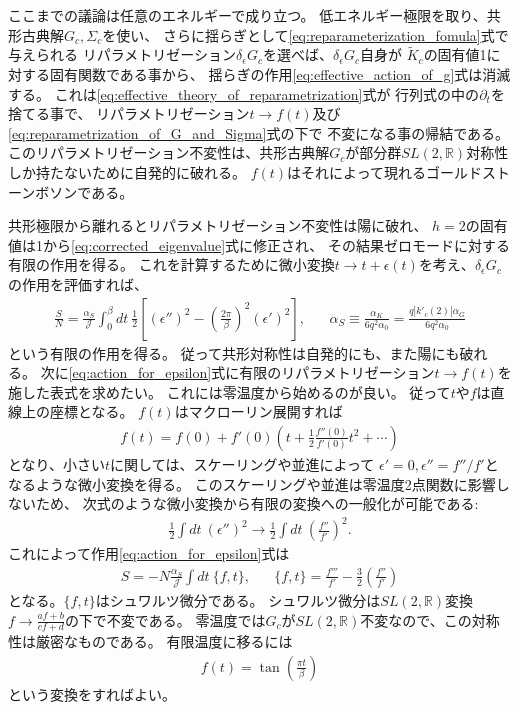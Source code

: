 ここまでの議論は任意のエネルギーで成り立つ。
低エネルギー極限を取り、共形古典解$G_c,\Sigma_c$を使い、
さらに揺らぎとして\eqref{eq:reparameterization_fomula}式で与えられる
リパラメトリゼーション$\delta_{\epsilon}G_c$を選べば、$\delta_{\epsilon}G_c$自身が
$\tilde{K}_c$の固有値1に対する固有関数である事から、
揺らぎの作用\eqref{eq:effective_action_of_g}式は消滅する。
これは\eqref{eq:effective_theory_of_reparametrization}式が
行列式の中の$\partial_t$を捨てる事で、
リパラメトリゼーション$t\to f(t)$及び\eqref{eq:reparametrization_of_G_and_Sigma}式の下で
不変になる事の帰結である。
このリパラメトリゼーション不変性は、共形古典解$G_c$が部分群$SL(2,\mathbb{R})$対称性
しか持たないために自発的に破れる。
$f(t)$はそれによって現れるゴールドストーンボソンである。

共形極限から離れるとリパラメトリゼーション不変性は陽に破れ、
$h=2$の固有値は1から\eqref{eq:corrected_eigenvalue}式に修正され、
その結果ゼロモードに対する有限の作用を得る。
これを計算するために微小変換$t\to t + \epsilon(t)$を考え、$\delta_{\epsilon}G_c$の作用を評価すれば、
\begin{align}
	\frac{S}{N} = \frac{\alpha_S}{\mathcal{J}}\int_0^{\beta}dt\ \frac{1}{2}
		\left[
			\left(\epsilon''\right)^2 - \left(\frac{2\pi}{\beta}\right)^2(\epsilon')^2
		\right],\hspace{20pt}
	\alpha_S \equiv \frac{\alpha_K}{6q^2\alpha_0} = \frac{q|k'_c(2)|\alpha_G}{6q^2\alpha_0}
	\label{eq:action_for_epsilon}
\end{align}
という有限の作用を得る。
従って共形対称性は自発的にも、また陽にも破れる。
次に\eqref{eq:action_for_epsilon}式に有限のリパラメトリゼーション$t\to f(t)$を施した表式を求めたい。
これには零温度から始めるのが良い。
従って$t$や$f$は直線上の座標となる。
$f(t)$はマクローリン展開すれば
\begin{align}
	f(t) = f(0) + f'(0)\left(t
		+ \frac{1}{2}\frac{f''(0)}{f'(0)}t^2 + \cdots
	\right)
\end{align}
となり、小さい$t$に関しては、スケーリングや並進によって
$\epsilon' = 0, \epsilon'' = f''/f'$となるような微小変換を得る。
このスケーリングや並進は零温度2点関数に影響しないため、
次式のような微小変換から有限の変換への一般化が可能である:
\begin{align}
	\frac{1}{2}\int dt\ (\epsilon'')^2 \to 
	\frac{1}{2}\int dt\ \left(\frac{f''}{f'}\right)^2.
\end{align}
これによって作用\eqref{eq:action_for_epsilon}式は
\begin{align}
	S = -N\frac{\alpha_S}{\mathcal{J}}\int dt\ \{f, t\},\hspace{20pt}
	\{f, t\} = \frac{f'''}{f'} - \frac{3}{2}\left(\frac{f''}{f'}\right)
	\label{eq:Schwartzian_action}
\end{align}
となる。$\{f,t\}$はシュワルツ微分である。
シュワルツ微分は$SL(2, \mathbb{R})$変換$f \to \frac{af + b}{cf + d}$の下で不変である。
零温度では$G_c$が$SL(2, \mathbb{R})$不変なので、この対称性は厳密なものである。
有限温度に移るには
\begin{align}
	f(t) = \tan\left(\frac{\pi t}{\beta}\right)
\end{align}
という変換をすればよい。

\pagebreak